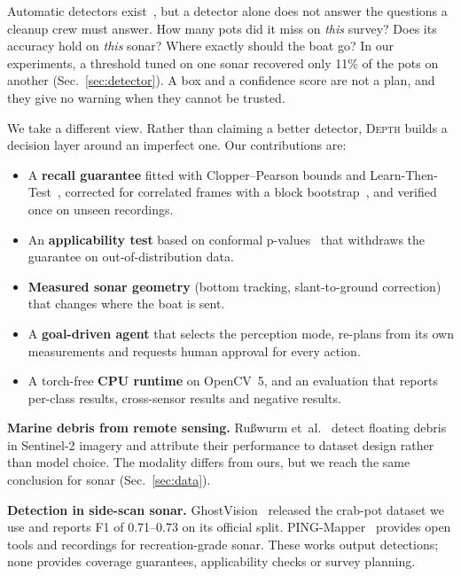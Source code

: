 \documentclass[10pt,twocolumn,letterpaper]{article}
\makeatletter
\renewcommand\section{\@startsection{section}{1}{\z@}{-2.0ex plus -0.5ex minus -.2ex}{1.0ex plus .2ex}{\large\bfseries}}
\newcommand{\depth}{\textsc{Depth}}
\newcommand{\etal}{et~al.\@}
\makeatother
\begin{document}
Automatic detectors exist~\cite{ghostvision}, but a detector alone does not
answer the questions a cleanup crew must answer. How many pots did it miss on
\emph{this} survey? Does its accuracy hold on \emph{this} sonar? Where exactly
should the boat go? In our experiments, a threshold tuned on one sonar recovered
only 11\% of the pots on another (Sec.~\ref{sec:detector}). A box and a
confidence score are not a plan, and they give no warning when they cannot be
trusted.

We take a different view. Rather than claiming a better detector, \depth{}
builds a decision layer around an imperfect one. Our contributions are:
\begin{itemize}
\item A \textbf{recall guarantee} fitted with Clopper--Pearson bounds and
Learn-Then-Test~\cite{clopper,ltt}, corrected for correlated frames with a block
bootstrap~\cite{kunsch}, and verified once on unseen recordings.
\item An \textbf{applicability test} based on conformal p-values~\cite{vovk}
that withdraws the guarantee on out-of-distribution data.
\item \textbf{Measured sonar geometry} (bottom tracking, slant-to-ground
correction) that changes where the boat is sent.
\item A \textbf{goal-driven agent} that selects the perception mode, re-plans
from its own measurements and requests human approval for every action.
\item A torch-free \textbf{CPU runtime} on OpenCV~5, and an evaluation that
reports per-class results, cross-sensor results and negative results.
\end{itemize}

\section{Related Work}

\textbf{Marine debris from remote sensing.} Rußwurm \etal{}~\cite{russwurm2023}
detect floating debris in Sentinel-2 imagery and attribute their performance to
dataset design rather than model choice. The modality differs from ours, but we
reach the same conclusion for sonar (Sec.~\ref{sec:data}).

\textbf{Detection in side-scan sonar.} GhostVision~\cite{ghostvision} released
the crab-pot dataset we use and reports F1 of 0.71--0.73 on its official split.
PING-Mapper~\cite{pingmapper} provides open tools and recordings for
recreation-grade sonar. These works output detections; none provides coverage
guarantees, applicability checks or survey planning.
\end{document}
